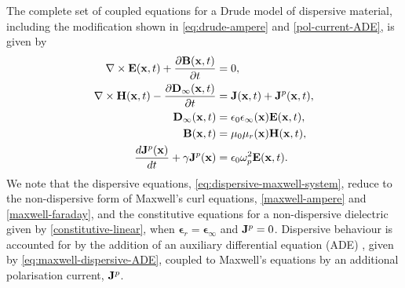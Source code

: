 The complete set of coupled equations for a Drude model of dispersive material, including the modification shown in \eqref{eq:drude-ampere} and \eqref{pol-current-ADE}, is given by
\begin{subequations}
    \label{eq:dispersive-maxwell-system}
    \begin{align}
        \nabla \times \mathbf{E}(\mathbf{x},t) + \frac{\partial  \mathbf{B}(\mathbf{x}, t)}{\partial t}&= 0, \\
        \nabla \times \mathbf{H}(\mathbf{x},t) - \frac{\partial  \mathbf{D}_{\infty}(\mathbf{x}, t) }{\partial t}&= \mathbf{J}(\mathbf{x},t) + \mathbf{J}^p(\mathbf{x},t), \\
        \mathbf{D}_{\infty}(\mathbf{x},t) &= \epsilon_0 \epsilon_{\infty}(\mathbf{x}) \mathbf{E}(\mathbf{x},t), \\
        \mathbf{B}(\mathbf{x},t) &= \mu_0 \mu_r(\mathbf{x}) \mathbf{H}(\mathbf{x},t), \\
        \frac{d \mathbf{J}^p(\mathbf{x})}{dt} + \gamma \mathbf{J}^p(\mathbf{x}) &= \epsilon_0 \omega_p^2 \mathbf{E}(\mathbf{x}, t) . \label{eq:maxwell-dispersive-ADE}
    \end{align}
\end{subequations}
%
We note that the dispersive equations, \eqref{eq:dispersive-maxwell-system}, reduce to the non-dispersive form of Maxwell's curl equations, \eqref{maxwell-ampere} and \eqref{maxwell-faraday}, and the constitutive equations for a non-dispersive dielectric given by \eqref{constitutive-linear}, when $\mathbf{\epsilon}_r = \mathbf{\epsilon}_{\infty}$ and $\mathbf{J}^p = 0$. Dispersive behaviour is accounted for by the addition of an auxiliary differential equation (ADE) \cite{Taflove:1989ds,Niegemann:2009uv,Ji:2007dl}, given by \eqref{eq:maxwell-dispersive-ADE}, coupled to Maxwell's equations by an additional polarisation current, $\mathbf{J}^p$.

